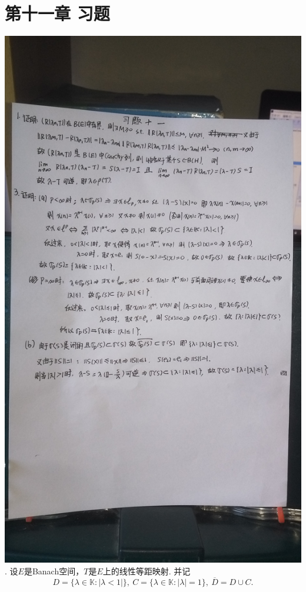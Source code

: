 \documentclass[a4paper,8pt]{ctexart}\textwidth 140mm \textheight 216mm
\newcommand{\8}{\infty}
\begin{document}
\section{第十一章 习题}
\includegraphics[scale=0.18]{11_1_3.jpg}
. 设$E$是Banach空间，$T$是$E$上的线性等距映射. 并记
\[D=\{\lambda\in\mathbb{K}:|\lambda<1|\},\ C=\{\lambda\in\mathbb{K}:|\lambda|=1\},\ \overline{D}=D\cup C.\]
\end{document}
